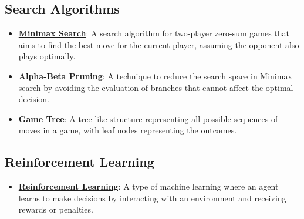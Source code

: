 \documentclass{article}%
\begin{document}
%
\subsection{Search Algorithms}%
\label{subsec:SearchAlgorithms}%
\begin{itemize}[leftmargin=*]%
\item \href{https://purdue.brightspace.com/d2l/common/assets/pdfjs-d2l-dist/1.0.14-legacy/web/viewer.html?file=\%2Fcontent\%2Fenforced\%2F1095467-wl.202510.CS.24300.001\%2F02L2-Intro.pdf\%3Fou\%3D1095467\&lang=en-us\&container=d2l-fileviewer-rendered-pdf\&fullscreen=d2l-fileviewer-rendered-pdf-dialog\&height=667#page=22}{\textbf{Minimax Search}}: A search algorithm for two{-}player zero{-}sum games that aims to find the best move for the current player, assuming the opponent also plays optimally.%
\item \href{https://purdue.brightspace.com/d2l/common/assets/pdfjs-d2l-dist/1.0.14-legacy/web/viewer.html?file=\%2Fcontent\%2Fenforced\%2F1095467-wl.202510.CS.24300.001\%2F02L2-Intro.pdf\%3Fou\%3D1095467\&lang=en-us\&container=d2l-fileviewer-rendered-pdf\&fullscreen=d2l-fileviewer-rendered-pdf-dialog\&height=667#page=23}{\textbf{Alpha{-}Beta Pruning}}: A technique to reduce the search space in Minimax search by avoiding the evaluation of branches that cannot affect the optimal decision.%
\item \href{https://purdue.brightspace.com/d2l/common/assets/pdfjs-d2l-dist/1.0.14-legacy/web/viewer.html?file=\%2Fcontent\%2Fenforced\%2F1095467-wl.202510.CS.24300.001\%2F02L2-Intro.pdf\%3Fou\%3D1095467\&lang=en-us\&container=d2l-fileviewer-rendered-pdf\&fullscreen=d2l-fileviewer-rendered-pdf-dialog\&height=667#page=11}{\textbf{Game Tree}}: A tree{-}like structure representing all possible sequences of moves in a game, with leaf nodes representing the outcomes.%
\end{itemize}

%
\subsection{Reinforcement Learning}%
\label{subsec:ReinforcementLearning}%
\begin{itemize}[leftmargin=*]%
\item \href{https://purdue.brightspace.com/d2l/common/assets/pdfjs-d2l-dist/1.0.14-legacy/web/viewer.html?file=\%2Fcontent\%2Fenforced\%2F1095467-wl.202510.CS.24300.001\%2F02L2-Intro.pdf\%3Fou\%3D1095467\&lang=en-us\&container=d2l-fileviewer-rendered-pdf\&fullscreen=d2l-fileviewer-rendered-pdf-dialog\&height=667#page=46}{\textbf{Reinforcement Learning}}: A type of machine learning where an agent learns to make decisions by interacting with an environment and receiving rewards or penalties.%
\end{itemize}
\end{document}
